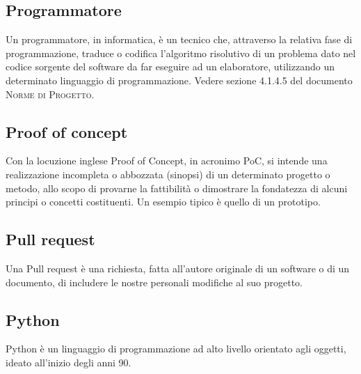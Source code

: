 \subsection*{Programmatore}
Un programmatore, in informatica, è un tecnico che, attraverso la relativa fase di programmazione, traduce o codifica l'algoritmo risolutivo di un problema dato nel codice sorgente del software da far eseguire ad un elaboratore, utilizzando un determinato linguaggio di programmazione. Vedere sezione 4.1.4.5 del documento \textsc{Norme di Progetto}.

\subsection*{Proof of concept}
Con la locuzione inglese Proof of Concept, in acronimo PoC, si intende una realizzazione incompleta o abbozzata (sinopsi) di un determinato progetto o metodo, allo scopo di provarne la fattibilità o dimostrare la fondatezza di alcuni principi o concetti costituenti. Un esempio tipico è quello di un prototipo.

\subsection*{Pull request}
Una Pull request è una richiesta, fatta all’autore originale di un software o di un documento, di includere le nostre personali modifiche al suo progetto.

\subsection*{Python}
Python è un linguaggio di programmazione ad alto livello orientato agli oggetti, ideato all'inizio degli anni 90.


